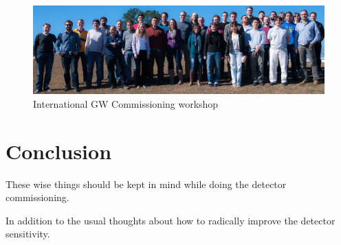 \begin{figure}[h]
\centering
\includegraphics[width=\columnwidth]{Figures/GroupPhoto_LLOworkshop13.jpg}
\caption{International GW Commissioning workshop}
\label{fig:workshopPhotoLLO}
\end{figure}

\section{Conclusion}
These wise things should be kept in mind while doing the detector commissioning.

In addition to the usual thoughts about how to radically improve the detector sensitivity.



